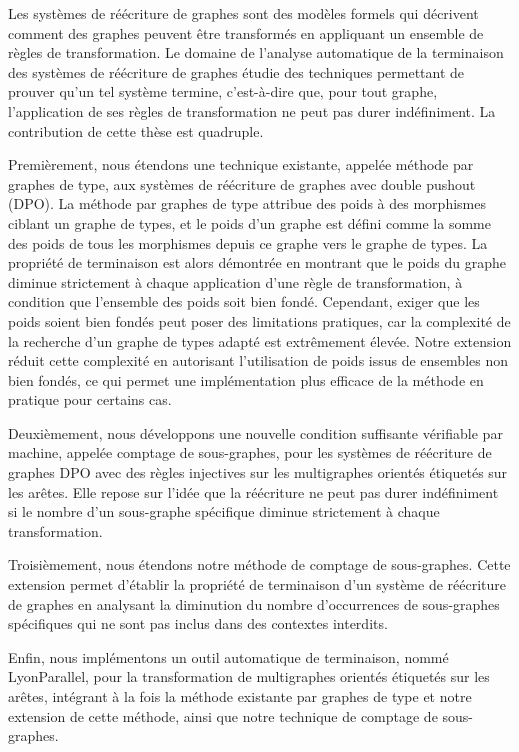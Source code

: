 Les systèmes de réécriture de graphes sont des modèles formels qui décrivent comment des graphes peuvent être transformés en appliquant un ensemble de règles de transformation. Le domaine de l'analyse automatique de la terminaison des systèmes de réécriture de graphes étudie des techniques permettant de prouver qu'un tel système termine, c'est-à-dire que, pour tout graphe, l'application de ses règles de transformation ne peut pas durer indéfiniment. La contribution de cette thèse est quadruple.

Premièrement, nous étendons une technique existante, appelée méthode par graphes de type, aux systèmes de réécriture de graphes avec double pushout (DPO). La méthode par graphes de type attribue des poids à des morphismes ciblant un graphe de types, et le poids d'un graphe est défini comme la somme des poids de tous les morphismes depuis ce graphe vers le graphe de types. La propriété de terminaison est alors démontrée en montrant que le poids du graphe diminue strictement à chaque application d'une règle de transformation, à condition que l'ensemble des poids soit bien fondé. Cependant, exiger que les poids soient bien fondés peut poser des limitations pratiques, car la complexité de la recherche d'un graphe de types adapté est extrêmement élevée. Notre extension réduit cette complexité en autorisant l'utilisation de poids issus de ensembles non bien fondés, ce qui permet une implémentation plus efficace de la méthode en pratique pour certains cas.

Deuxièmement, nous développons une nouvelle condition suffisante vérifiable par machine, appelée comptage de sous-graphes, pour les systèmes de réécriture de graphes DPO avec des règles injectives sur les multigraphes orientés étiquetés sur les arêtes. Elle repose sur l'idée que la réécriture ne peut pas durer indéfiniment si le nombre d'un sous-graphe spécifique diminue strictement à chaque transformation.

Troisièmement, nous étendons notre méthode de comptage de sous-graphes. Cette extension permet d'établir la propriété de terminaison d'un système de réécriture de graphes en analysant la diminution du nombre d'occurrences de sous-graphes spécifiques qui ne sont pas inclus dans des contextes interdits.

Enfin, nous implémentons un outil automatique de terminaison, nommé LyonParallel, pour la transformation de multigraphes orientés étiquetés sur les arêtes, intégrant à la fois la méthode existante par graphes de type et notre extension de cette méthode, ainsi que notre technique de comptage de sous-graphes.